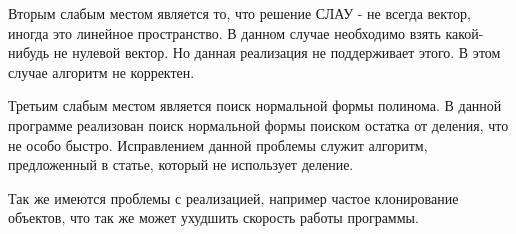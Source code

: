 \documentclass{article}
\begin{document}
 Вторым слабым местом является то, что решение СЛАУ - не всегда вектор, иногда это линейное пространство. В данном случае необходимо взять
 какой-нибудь не нулевой вектор. Но данная реализация не поддерживает этого. В этом случае алгоритм не корректен.

 Третьим слабым местом является поиск нормальной формы полинома. В данной программе реализован поиск нормальной формы поиском остатка от деления, 
 что не особо быстро. Исправлением данной проблемы служит алгоритм, предложенный в статье, который не использует деление.

 Так же имеются проблемы с реализацией, например частое клонирование объектов, что так же может ухудшить скорость работы программы. 
\end{document}
